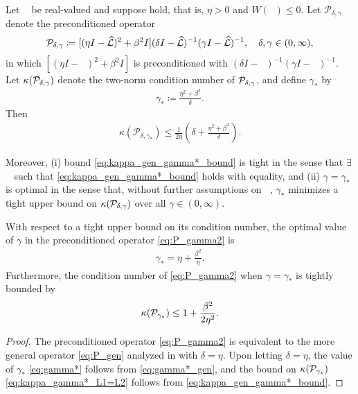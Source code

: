 \documentclass[review]{siamart}
\DeclareMathOperator{\cL}{\widehat{\mathcal{L}}}
\begin{document}
\begin{theorem}[Optimal preconditioning, $\cL_1 = \cL_2$ \cite{irk1}]
\label{th:cond_L1=L2}
Let $\cL$ be real-valued and suppose  hold,
that is, $\eta > 0$ and $W(\cL) \leq 0$. Let $\mathcal{P}_{\delta,\gamma}$ denote
the preconditioned operator
\begin{align} \label{eq:P_gen}
{\cal P}_{\delta, \gamma} \coloneqq [(\eta I  - \cL)^2 + \beta^2 I]
	(\delta I - \cL)^{-1} (\gamma I - \cL)^{-1}, \quad \delta, \gamma \in (0, \infty),
\end{align}
in which $[(\eta I  - \cL)^2 + \beta^2 I]$ is preconditioned with $(\delta I - \cL)^{-1} (\gamma I - \cL)^{-1}$.
%
Let $\kappa({\cal P}_{\delta, \gamma})$ denote the two-norm condition number of ${\cal P}_{\delta,\gamma}$,
and define $\gamma_*$ by
\begin{align} \label{eq:gamma*_gen}
\gamma_* \coloneqq \frac{\eta^2+\beta^2}{\delta}.
\end{align}
Then
\begin{align} \label{eq:kappa_gen_gamma*_bound}
\kappa(\mathcal{P}_{\delta, \gamma_*}) \leq \frac{1}{2 \eta} \left( \delta + \frac{\eta^2 + \beta^2}{\delta} \right).
\end{align}

Moreover, (i) bound \eqref{eq:kappa_gen_gamma*_bound} is tight in the sense that $\exists$ $\cL$
such that \eqref{eq:kappa_gen_gamma*_bound} holds with equality, and (ii) $\gamma = \gamma_*$ is optimal
in the sense that, without further assumptions on $\cL$, $\gamma_*$ minimizes a tight
upper bound on $\kappa({\cal P}_{\delta, \gamma})$ over all $\gamma \in (0, \infty)$.
\end{theorem}

\begin{corollary}
\label{col:cond_L1=L2}
With respect to a tight upper bound on its condition number, the optimal value of $\gamma$ in the preconditioned operator \eqref{eq:P_gamma2} is
\begin{align} \label{eq:gamma*}
\gamma_* =  \eta + \frac{\beta^2}{\eta}.
\end{align}
Furthermore, the condition number of \eqref{eq:P_gamma2} when $\gamma = \gamma_*$ is tightly bounded by
\begin{align} \label{eq:kappa_gamma*_L1=L2}
\kappa({\cal P}_{\gamma_*}) \leq  1 +  \frac{\beta^2}{2\eta^2}.
\end{align}
\end{corollary}
\begin{proof}
The preconditioned operator \eqref{eq:P_gamma2} is equivalent to the more general operator \eqref{eq:P_gen} analyzed in  with $\delta = \eta$. Upon letting $\delta = \eta$, the value of $\gamma_*$ \eqref{eq:gamma*} follows from \eqref{eq:gamma*_gen}, and the bound on $\kappa({\cal P}_{\gamma_*})$ \eqref{eq:kappa_gamma*_L1=L2} follows from \eqref{eq:kappa_gen_gamma*_bound}.
\end{proof}
\end{document}
